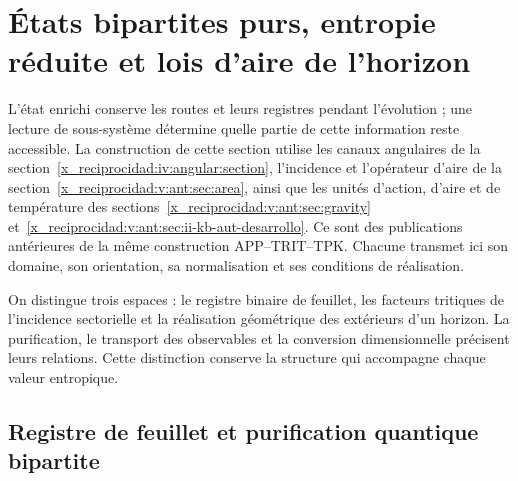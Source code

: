 


\chapter{États bipartites purs, entropie réduite et lois d’aire de l’horizon}
\label{x_reciprocidad:vii:sec:horizontes-informacion}

L'état enrichi conserve les routes et leurs registres pendant
l'évolution ; une lecture de sous-système détermine quelle partie de cette information
reste accessible. La construction de cette section utilise les canaux
angulaires de la section~\ref{x_reciprocidad:iv:angular:section}, l'incidence et
l'opérateur d'aire de la section~\ref{x_reciprocidad:v:ant:sec:area}, ainsi que les unités
d'action, d'aire et de température des
sections~\ref{x_reciprocidad:v:ant:sec:gravity}
et~\ref{x_reciprocidad:v:ant:sec:ii-kb-aut-desarrollo}. Ce sont des publications antérieures de la
même construction APP--TRIT--TPK. Chacune transmet ici son domaine,
son orientation, sa normalisation et ses conditions de réalisation.

On distingue trois espaces : le registre binaire de feuillet, les facteurs
tritiques de l'incidence sectorielle et la réalisation géométrique des
extérieurs d'un horizon. La purification, le transport des observables
et la conversion dimensionnelle précisent leurs relations. Cette
distinction conserve la structure qui accompagne chaque valeur entropique.

\section{Registre de feuillet et purification quantique bipartite}
\label{x_reciprocidad:vii:subsec:hojas-purificacion}

